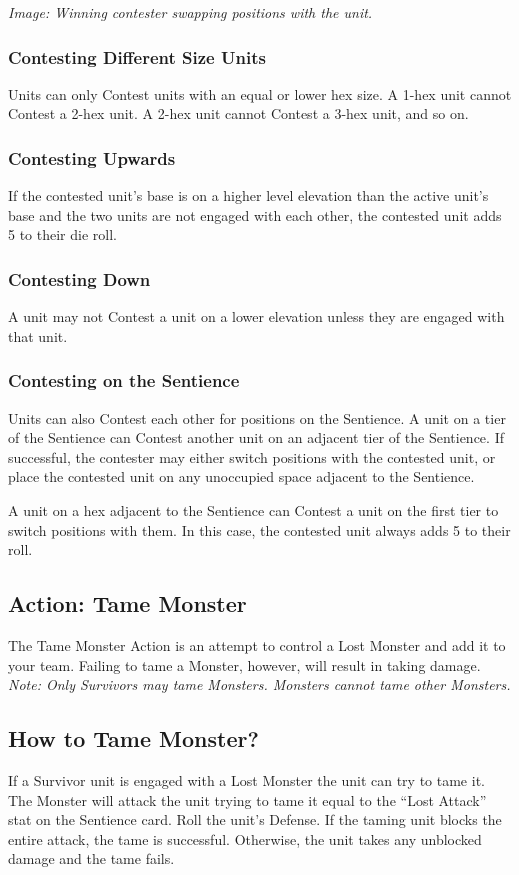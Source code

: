 \documentclass[../main.tex]{subfiles}
\begin{document}
\textit{Image: Winning contester swapping positions with the unit.}

\subsubsection{Contesting Different Size Units}
Units can only Contest units with an equal or lower hex size. A 1-hex unit cannot Contest a 2-hex unit. A 2-hex unit cannot Contest a 3-hex unit, and so on.

\subsubsection{Contesting Upwards}
If the contested unit’s base is on a higher level elevation than the active unit’s base and the two units are not engaged with each other, the contested unit adds 5 to their die roll.

\subsubsection{Contesting Down}
A unit may not Contest a unit on a lower elevation unless they are engaged with that unit.

\subsubsection{Contesting on the Sentience}
Units can also Contest each other for positions on the Sentience. A unit on a tier of the Sentience can Contest another unit on an adjacent tier of the Sentience. If successful, the contester may either switch positions with the contested unit, or place the contested unit on any unoccupied space adjacent to the Sentience.

A unit on a hex adjacent to the Sentience can Contest a unit on the first tier to switch positions with them. In this case, the contested unit always adds 5 to their roll.

\subsection{Action: Tame Monster}
The Tame Monster Action is an attempt to control a Lost Monster and add it to your team. Failing to tame a Monster, however, will result in taking damage.
\textit{Note: Only Survivors may tame Monsters. Monsters cannot tame other Monsters.}

\subsection{How to Tame Monster? }
If a Survivor unit is engaged with a Lost Monster the unit can try to tame it. The Monster will attack the unit trying to tame it equal to the “Lost Attack” stat on the Sentience card. Roll the unit’s Defense. If the taming unit blocks the entire attack, the tame is successful. Otherwise, the unit takes any unblocked damage and the tame fails.
\end{document}
